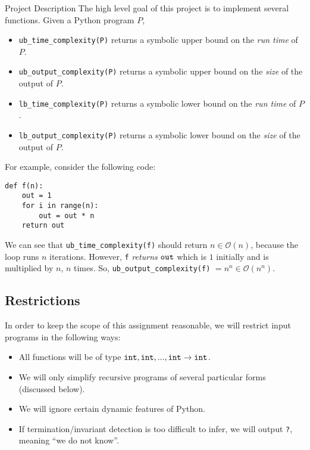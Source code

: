 \documentclass{mfcs}
\begin{document}
\begin{question}{Project Description}
  The high level goal of this project is to implement several functions. Given a
  Python program $P$,
\begin{itemize}
    \item \verb+ub_time_complexity(P)+ returns a symbolic upper bound on the \emph{run time} of $P$.
    \item \verb+ub_output_complexity(P)+ returns a symbolic upper bound on the \emph{size} of the output of $P$.
    \item \verb+lb_time_complexity(P)+ returns a symbolic lower bound on the \emph{run time} of $P$.
    \item \verb+lb_output_complexity(P)+ returns a symbolic lower bound on the \emph{size} of the output of $P$.
\end{itemize}

For example, consider the following code:
\begin{lstlisting}
def f(n):
    out = 1
    for i in range(n):
        out = out * n
    return out
\end{lstlisting}

We can see that \verb+ub_time_complexity(f)+ should return $n \in
\mathcal{O}(n)$, because the loop runs $n$ iterations. However, \verb+f+
\emph{returns} $\verb+out+$ which is $1$ initially and is multiplied by $n$, $n$
times. So, \verb+ub_output_complexity(f)+ $=n^n \in \mathcal{O}(n^n)$.

{\color{colour}\subsection{Restrictions}}

In order to keep the scope of this assignment reasonable, we will restrict input
programs in the following ways:
\begin{itemize}
\item All functions will be of type $\verb+int+, \verb+int+, ..., \verb+int+ \to
  \verb+int+$.
\item We will only simplify recursive programs of several particular forms
  (discussed below).
\item We will ignore certain dynamic features of Python.
\item If termination/invariant detection is too difficult to infer, we will
  output \verb+?+, meaning ``we do not know''.
\end{itemize}
\end{question}
\end{document}

